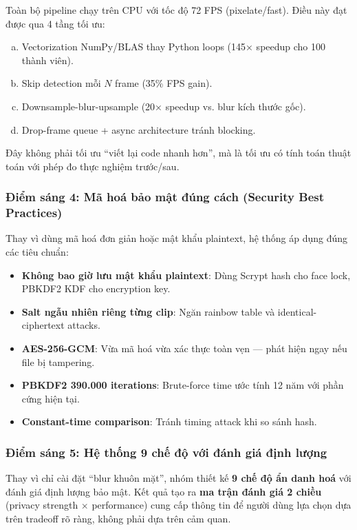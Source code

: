 Toàn bộ pipeline chạy trên CPU với tốc độ 72 FPS (pixelate/fast). Điều này đạt được qua 4 tầng tối ưu:
\begin{enumerate}[a)]
    \item Vectorization NumPy/BLAS thay Python loops (145× speedup cho 100 thành viên).
    \item Skip detection mỗi $N$ frame (35\% FPS gain).
    \item Downsample-blur-upsample (20× speedup vs. blur kích thước gốc).
    \item Drop-frame queue + async architecture tránh blocking.
\end{enumerate}
Đây không phải tối ưu ``viết lại code nhanh hơn'', mà là tối ưu có tính toán thuật toán với phép đo thực nghiệm trước/sau.

\subsubsection{Điểm sáng 4: Mã hoá bảo mật đúng cách (Security Best Practices)}

Thay vì dùng mã hoá đơn giản hoặc mật khẩu plaintext, hệ thống áp dụng đúng các tiêu chuẩn:
\begin{itemize}
    \item \textbf{Không bao giờ lưu mật khẩu plaintext}: Dùng Scrypt hash cho face lock, PBKDF2 KDF cho encryption key.
    \item \textbf{Salt ngẫu nhiên riêng từng clip}: Ngăn rainbow table và identical-ciphertext attacks.
    \item \textbf{AES-256-GCM}: Vừa mã hoá vừa xác thực toàn vẹn --- phát hiện ngay nếu file bị tampering.
    \item \textbf{PBKDF2 390.000 iterations}: Brute-force time ước tính 12 năm với phần cứng hiện tại.
    \item \textbf{Constant-time comparison}: Tránh timing attack khi so sánh hash.
\end{itemize}

\subsubsection{Điểm sáng 5: Hệ thống 9 chế độ với đánh giá định lượng}

Thay vì chỉ cài đặt ``blur khuôn mặt'', nhóm thiết kế \textbf{9 chế độ ẩn danh hoá} với đánh giá định lượng bảo mật. Kết quả tạo ra \textbf{ma trận đánh giá 2 chiều} (privacy strength $\times$ performance) cung cấp thông tin để người dùng lựa chọn dựa trên tradeoff rõ ràng, không phải dựa trên cảm quan.

